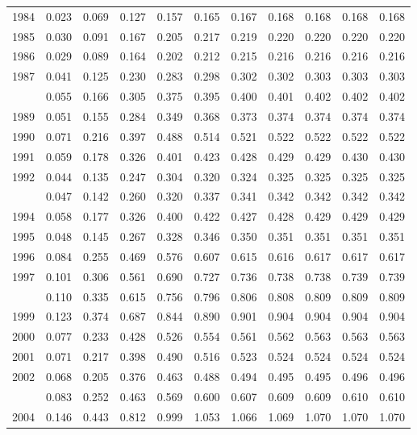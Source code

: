 \documentclass[
]{article}
\begin{document}
\begin{longtable}[t]{lrrrrrrrrrr}
1984 & 0.023 & 0.069 & 0.127 & 0.157 & 0.165 & 0.167 & 0.168 & 0.168 & 0.168 & 0.168\\
1985 & 0.030 & 0.091 & 0.167 & 0.205 & 0.217 & 0.219 & 0.220 & 0.220 & 0.220 & 0.220\\
1986 & 0.029 & 0.089 & 0.164 & 0.202 & 0.212 & 0.215 & 0.216 & 0.216 & 0.216 & 0.216\\
1987 & 0.041 & 0.125 & 0.230 & 0.283 & 0.298 & 0.302 & 0.302 & 0.303 & 0.303 & 0.303\\
\addlinespace
1988 & 0.055 & 0.166 & 0.305 & 0.375 & 0.395 & 0.400 & 0.401 & 0.402 & 0.402 & 0.402\\
1989 & 0.051 & 0.155 & 0.284 & 0.349 & 0.368 & 0.373 & 0.374 & 0.374 & 0.374 & 0.374\\
1990 & 0.071 & 0.216 & 0.397 & 0.488 & 0.514 & 0.521 & 0.522 & 0.522 & 0.522 & 0.522\\
1991 & 0.059 & 0.178 & 0.326 & 0.401 & 0.423 & 0.428 & 0.429 & 0.429 & 0.430 & 0.430\\
1992 & 0.044 & 0.135 & 0.247 & 0.304 & 0.320 & 0.324 & 0.325 & 0.325 & 0.325 & 0.325\\
\addlinespace
1993 & 0.047 & 0.142 & 0.260 & 0.320 & 0.337 & 0.341 & 0.342 & 0.342 & 0.342 & 0.342\\
1994 & 0.058 & 0.177 & 0.326 & 0.400 & 0.422 & 0.427 & 0.428 & 0.429 & 0.429 & 0.429\\
1995 & 0.048 & 0.145 & 0.267 & 0.328 & 0.346 & 0.350 & 0.351 & 0.351 & 0.351 & 0.351\\
1996 & 0.084 & 0.255 & 0.469 & 0.576 & 0.607 & 0.615 & 0.616 & 0.617 & 0.617 & 0.617\\
1997 & 0.101 & 0.306 & 0.561 & 0.690 & 0.727 & 0.736 & 0.738 & 0.738 & 0.739 & 0.739\\
\addlinespace
1998 & 0.110 & 0.335 & 0.615 & 0.756 & 0.796 & 0.806 & 0.808 & 0.809 & 0.809 & 0.809\\
1999 & 0.123 & 0.374 & 0.687 & 0.844 & 0.890 & 0.901 & 0.904 & 0.904 & 0.904 & 0.904\\
2000 & 0.077 & 0.233 & 0.428 & 0.526 & 0.554 & 0.561 & 0.562 & 0.563 & 0.563 & 0.563\\
2001 & 0.071 & 0.217 & 0.398 & 0.490 & 0.516 & 0.523 & 0.524 & 0.524 & 0.524 & 0.524\\
2002 & 0.068 & 0.205 & 0.376 & 0.463 & 0.488 & 0.494 & 0.495 & 0.495 & 0.496 & 0.496\\
\addlinespace
2003 & 0.083 & 0.252 & 0.463 & 0.569 & 0.600 & 0.607 & 0.609 & 0.609 & 0.610 & 0.610\\
2004 & 0.146 & 0.443 & 0.812 & 0.999 & 1.053 & 1.066 & 1.069 & 1.070 & 1.070 & 1.070\\

\end{longtable}
\end{document}
